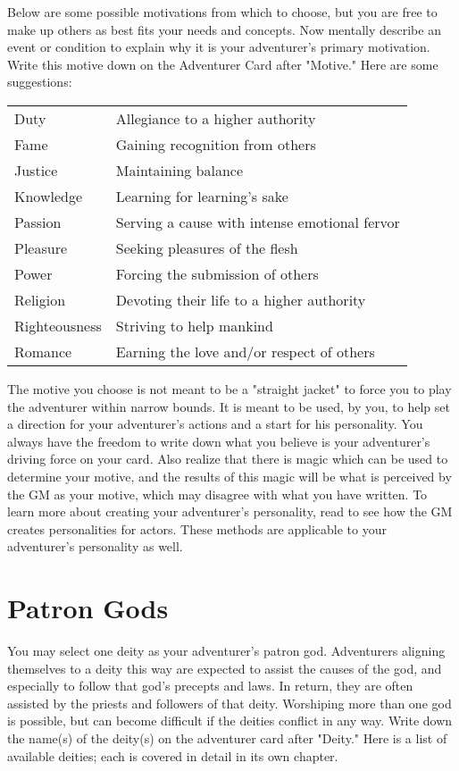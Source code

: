 Below are some possible motivations from which to choose, but you are free to make up others as best fits your needs and concepts. Now mentally describe an event or condition to explain why it is your adventurer's primary motivation. Write this motive down on the Adventurer Card after "Motive." Here are some suggestions:

\begin{normbox}[Motivation]
\small
\begin{tabularx}{\linewidth}{@{} l L}
Duty & Allegiance to a higher authority\\
Fame & Gaining recognition from others\\
Justice & Maintaining balance\\
Knowledge & Learning for learning's sake\\
Passion & Serving a cause with intense emotional fervor\\
Pleasure & Seeking pleasures of the flesh\\
Power & Forcing the submission of others\\
Religion & Devoting their life to a higher authority\\
Righteousness & Striving to help mankind\\
Romance & Earning the love and/or respect of others
\end{tabularx}
\end{normbox}

The motive you choose is not meant to be a "straight jacket" to force you to play the adventurer within narrow bounds. It is meant to be used, by you, to help set a direction for your adventurer's actions and a start for his personality. You always have the freedom to write down what you believe is your adventurer's driving force on your card. Also realize that there is magic which can be used to determine your motive, and the results of this magic will be what is perceived by the GM as your motive, which may disagree with what you have written.
To learn more about creating your adventurer's personality, read  to see how the GM creates personalities for actors. These methods are applicable to your adventurer's personality as well.
\section{Patron Gods}

You may select one deity as your adventurer's patron god. Adventurers aligning themselves to a deity this way are expected to assist the causes of the god, and especially to follow that god's precepts and laws. In return, they are often assisted by the priests and followers of that deity. Worshiping more than one god is possible, but can become difficult if the deities conflict in any way. Write down the name(s) of the deity(s) on the adventurer card after "Deity." Here is a list of available deities; each is covered in detail in its own chapter.

